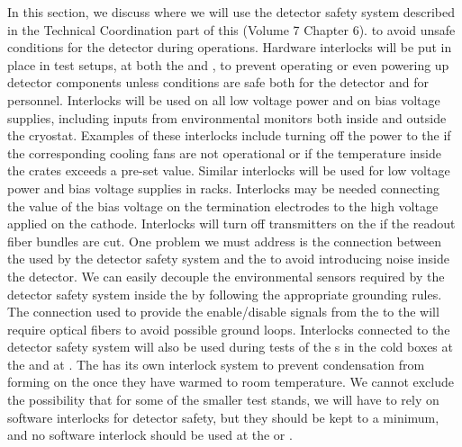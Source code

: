 In this section, we discuss where we will use
the detector safety system described in the Technical
Coordination part of this  (Volume 7 Chapter 6). %
to avoid unsafe conditions for the  detector 
during operations. Hardware interlocks will be put in place
in test setups, at both the  and , to prevent operating or even powering up
detector components 
unless conditions are safe
both for the detector and for personnel. Interlocks will be
used on all low voltage power and on bias voltage 
supplies, including inputs from environmental monitors both
inside and outside the cryostat. Examples of these interlocks include turning off the power to the 
if the corresponding cooling fans are not operational or
if the temperature inside the crates exceeds a pre-set value.
Similar interlocks will be used for low voltage power
and bias voltage supplies in  racks.
Interlocks may be needed connecting the value of the 
bias voltage on the  termination electrodes to the
high voltage applied on the  cathode. Interlocks will turn 
off transmitters on the  if the readout fiber 
bundles are cut. One problem we must address is 
the connection between the  used by the detector 
safety system and the  to avoid introducing noise 
inside the detector. We can easily decouple the environmental 
sensors required by the detector safety system inside the 
 by following the appropriate grounding rules. 
The connection used to provide the enable/disable signals 
from the  to the  will require optical 
fibers to avoid possible ground loops. Interlocks connected
to the detector safety system will also be used during tests 
of the s in the cold boxes at the  and 
at . The  has its own interlock system to
prevent condensation from forming on the  once
they have warmed to room temperature. We cannot exclude the possibility that for some of the smaller test stands, we will 
have to rely on software interlocks for detector safety,
but they should be kept to a minimum, and no software
interlock should be used at the  or .

